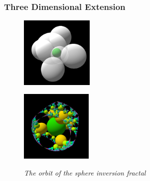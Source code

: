 \subsubsection{Three Dimensional Extension}

\begin{figure}[htbp]
 \begin{minipage}[t]{0.5\hsize}
  \center
  \includegraphics[height=1.35in, keepaspectratio]{img/preparation/3dExtension/3dKissingGenerator.png}
  \label{fig:simpleGen}
  \hspace*{\fill}
 \end{minipage}
 \begin{minipage}[t]{0.5\hsize}
  \center
  \includegraphics[height=1.35in, keepaspectratio]{img/preparation/3dExtension/3dOrbit.png}
  \label{fig:simpleOrb}
  \hspace*{\fill}
 \end{minipage}
 \caption{\textit{The orbit of the sphere inversion fractal}}
 \label{fig:simpleGenOrb}
\end{figure}

